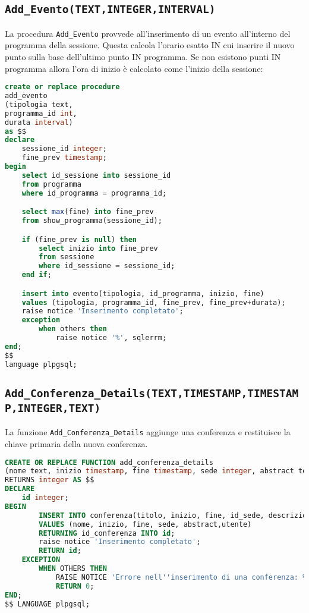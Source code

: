 \subsection{\texttt{Add\_Evento(TEXT,INTEGER,INTERVAL)}}
La procedura \texttt{Add\_Evento} provvede all'inserimento di un evento all'interno del programma della sessione. Questa calcola l'orario esatto IN cui inserire il nuovo punto sulla base dell'ultimo punto IN programma. Se non esistono punti IN programma allora l'ora di inizio è calcolato come l'inizio della sessione:
\begin{lstlisting}[language=SQL,style=mystyle]
create or replace procedure 
add_evento
(tipologia text, 
programma_id int, 
durata interval)
as $$
declare
    sessione_id integer;
    fine_prev timestamp;
begin
    select id_sessione into sessione_id
    from programma
    where id_programma = programma_id;

    select max(fine) into fine_prev
    from show_programma(sessione_id);

    if (fine_prev is null) then
        select inizio into fine_prev
        from sessione
        where id_sessione = sessione_id;
    end if;

    insert into evento(tipologia, id_programma, inizio, fine)
    values (tipologia, programma_id, fine_prev, fine_prev+durata);
    raise notice 'Inserimento completato';
    exception
        when others then
            raise notice '%', sqlerrm;
end;
$$
language plpgsql;
\end{lstlisting}
\subsection{\texttt{Add\_Conferenza\_Details(TEXT,TIMESTAMP,TIMESTAMP,INTEGER,TEXT)}}
La funzione \texttt{Add\_Conferenza\_Details} aggiunge una conferenza e restituisce la chiave primaria della nuova conferenza.
\begin{lstlisting}[language=SQL,style=mystyle]
CREATE OR REPLACE FUNCTION add_conferenza_details
(nome text, inizio timestamp, fine timestamp, sede integer, abstract text, utente integer)
RETURNS integer AS $$
DECLARE
    id integer;
BEGIN
        INSERT INTO conferenza(titolo, inizio, fine, id_sede, descrizione, id_utente) 
        VALUES (nome, inizio, fine, sede, abstract,utente)
        RETURNING id_conferenza INTO id;
        raise notice 'Inserimento completato';
        RETURN id;
    EXCEPTION
        WHEN OTHERS THEN
            RAISE NOTICE 'Errore nell''inserimento di una conferenza: %', SQLERRM;
            RETURN 0; 
END;
$$ LANGUAGE plpgsql;
\end{lstlisting}
